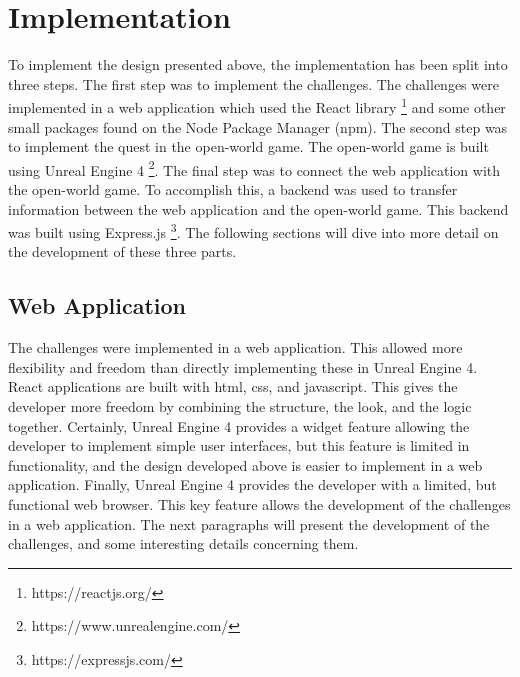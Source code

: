 \documentclass{l4proj}
\begin{document}
\chapter{Implementation}

To implement the design presented above, the implementation has been split into three steps.
The first step was to implement the challenges. The challenges were implemented in a web application
which used the React library \footnote{https://reactjs.org/} and some other small packages found on the Node Package Manager (npm).
The second step was to implement the quest in the open-world game. 
The open-world game is built using Unreal Engine 4 \footnote{https://www.unrealengine.com/}. 
The final step was to connect the web application with the open-world game. 
To accomplish this, a backend was used to transfer information between the web application and the open-world game.
This backend was built using Express.js \footnote{https://expressjs.com/}.
The following sections will dive into more detail on the development of these three parts.

\section{Web Application}

The challenges were implemented in a web application. 
This allowed more flexibility and freedom than directly implementing these in Unreal Engine 4.
React applications are built with html, css, and javascript. 
This gives the developer more freedom by combining the structure, the look, and the logic together.
Certainly, Unreal Engine 4 provides a widget feature allowing the developer to implement simple user interfaces, 
but this feature is limited in functionality, 
and the design developed above is easier to implement in a web application.
Finally, Unreal Engine 4 provides the developer with a limited, but functional web browser.
This key feature allows the development of the challenges in a web application.
The next paragraphs will present the development of the challenges, and some interesting details concerning them.
\end{document}
